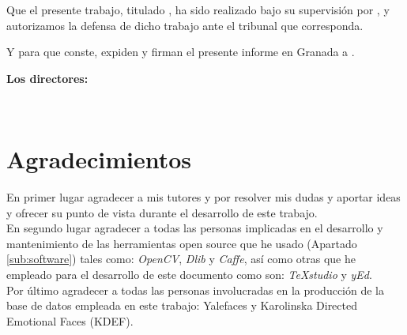 Que el presente trabajo, titulado \textit{\textbf{\myTitle}},
ha sido realizado bajo su supervisión por \textbf{\myName}, y autorizamos la defensa de dicho trabajo ante el tribunal
que corresponda.

\vspace{0.5cm}

Y para que conste, expiden y firman el presente informe en Granada a \myTime.

\vspace{1cm}

\textbf{Los directores:}

\vspace{5cm}

\noindent \textbf{\myProf \ \ \ \ \ \myOtherProf}

\chapter*{Agradecimientos}
\thispagestyle{empty}
\vspace{1cm}
En primer lugar agradecer a mis tutores \textbf{\myProf} y \textbf{\myOtherProf} por resolver mis dudas y aportar ideas y ofrecer su punto de vista durante el desarrollo de este trabajo.\\

En segundo lugar agradecer a todas las personas implicadas en el desarrollo y mantenimiento de las herramientas open source que he usado (Apartado \ref{sub:software}) tales como: \textit{OpenCV}\cite{opencv}, \textit{Dlib}\cite{dlib} y \textit{Caffe}\cite{caffe}, así como otras que he empleado para el desarrollo de este documento como son: \textit{TeXstudio}\cite{texstudio} y \textit{yEd}\cite{yed}. \\

Por último agradecer a todas las personas involucradas en la producción de la base de datos empleada en este trabajo: Yalefaces\cite{yalefaces} y Karolinska Directed Emotional Faces\cite{kdef98} (KDEF).


